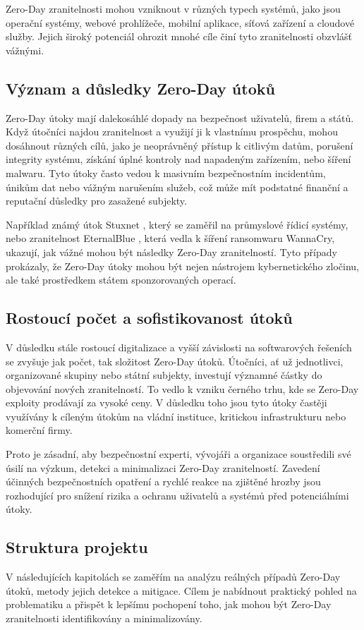 \documentclass[11pt, conference, a4paper]{IEEEtran}
\begin{document}
Zero-Day zranitelnosti mohou vzniknout v různých typech systémů, jako jsou operační systémy, webové prohlížeče, mobilní aplikace, síťová zařízení a cloudové služby. Jejich široký potenciál ohrozit mnohé cíle činí tyto zranitelnosti obzvlášť vážnými.

\subsection{Význam a důsledky Zero-Day útoků}
Zero-Day útoky mají dalekosáhlé dopady na bezpečnost uživatelů, firem a států. Když útočníci najdou zranitelnost a využijí ji k vlastnímu prospěchu, mohou dosáhnout různých cílů, jako je neoprávněný přístup k citlivým datům, porušení integrity systému, získání úplné kontroly nad napadeným zařízením, nebo šíření malwaru. Tyto útoky často vedou k masivním bezpečnostním incidentům, únikům dat nebo vážným narušením služeb, což může mít podstatné finanční a reputační důsledky pro zasažené subjekty.

Například známý útok Stuxnet \cite{Popelova2016thesis}, který se zaměřil na průmyslové řídicí systémy, nebo zranitelnost EternalBlue \cite{EB}, která vedla k šíření ransomwaru WannaCry, ukazují, jak vážné mohou být následky Zero-Day zranitelností. Tyto případy prokázaly, že Zero-Day útoky mohou být nejen nástrojem kybernetického zločinu, ale také prostředkem státem sponzorovaných operací.

\subsection{Rostoucí počet a sofistikovanost útoků}
V důsledku stále rostoucí digitalizace a vyšší závislosti na softwarových řešeních se zvyšuje jak počet, tak složitost Zero-Day útoků. Útočníci, ať už jednotlivci, organizované skupiny nebo státní subjekty, investují významné částky do objevování nových zranitelností. To vedlo k vzniku černého trhu, kde se Zero-Day exploity prodávají za vysoké ceny. V důsledku toho jsou tyto útoky častěji využívány k cíleným útokům na vládní instituce, kritickou infrastrukturu nebo komerční firmy.

Proto je zásadní, aby bezpečnostní experti, vývojáři a organizace soustředili své úsilí na výzkum, detekci a minimalizaci Zero-Day zranitelností. Zavedení účinných bezpečnostních opatření a rychlé reakce na zjištěné hrozby jsou rozhodující pro snížení rizika a ochranu uživatelů a systémů před potenciálními útoky.

\subsection{Struktura projektu}
V následujících kapitolách se zaměřím na analýzu reálných případů Zero-Day útoků, metody jejich detekce a mitigace. Cílem je nabídnout praktický pohled na problematiku a přispět k lepšímu pochopení toho, jak mohou být Zero-Day zranitelnosti identifikovány a minimalizovány.
\end{document}

